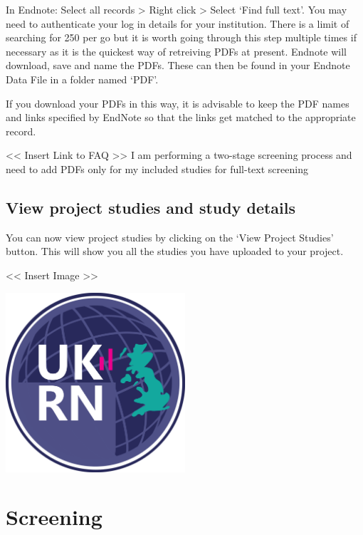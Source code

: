 \documentclass[
]{book}
\begin{document}
In Endnote: Select all records \textgreater{} Right click \textgreater{} Select `Find full text'. You may need to authenticate your log in details for your institution. There is a limit of searching for 250 per go but it is worth going through this step multiple times if necessary as it is the quickest way of retreiving PDFs at present. Endnote will download, save and name the PDFs. These can then be found in your Endnote Data File in a folder named `PDF'.

If you download your PDFs in this way, it is advisable to keep the PDF names and links specified by EndNote so that the links get matched to the appropriate record.

\textless{}\textless{} Insert Link to FAQ \textgreater{}\textgreater{}
I am performing a two-stage screening process and need to add PDFs only for my included studies for full-text screening

\hypertarget{view-project-studies-and-study-details}{%
\section{View project studies and study details}\label{view-project-studies-and-study-details}}

You can now view project studies by clicking on the `View Project Studies' button. This will show you all the studies you have uploaded to your project.

\textless{}\textless{} Insert Image \textgreater{}\textgreater{}

\includegraphics[width=0.5\textwidth,height=0.5\textheight]{figs/evidence-triangle.png}

\hypertarget{screening}{%
\chapter{Screening}\label{screening}}
\end{document}
